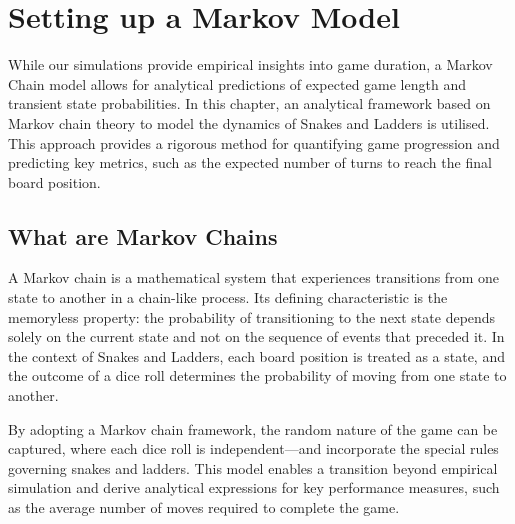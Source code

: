 \chapter{Setting up a Markov Model}
While our simulations provide empirical insights into game duration, a Markov Chain model allows for analytical predictions of expected game length and transient state probabilities.
In this chapter, an analytical framework based on Markov chain theory to model the dynamics of Snakes and Ladders is utilised. This approach provides a rigorous method for quantifying game progression and predicting key metrics, such as the expected number of turns to reach the final board position. 

\section{What are Markov Chains}
A Markov chain is a mathematical system that experiences transitions from one state to another in a chain-like process. Its defining characteristic is the memoryless property: the probability of transitioning to the next state depends solely on the current state and not on the sequence of events that preceded it. In the context of Snakes and Ladders, each board position is treated as a state, and the outcome of a dice roll determines the probability of moving from one state to another.

By adopting a Markov chain framework, the random nature of the game can be captured, where each dice roll is independent—and incorporate the special rules governing snakes and ladders. This model enables a transition beyond empirical simulation and derive analytical expressions for key performance measures, such as the average number of moves required to complete the game.

